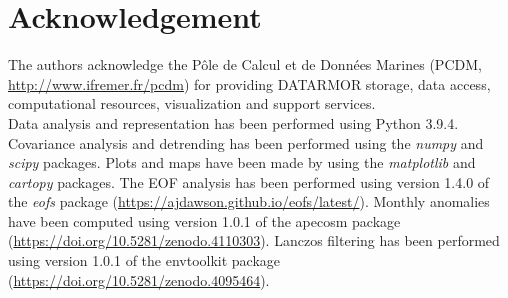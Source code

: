 \documentclass[review, 12pt]{elsarticle}
\begin{document}
\section*{Acknowledgement}

The authors acknowledge the Pôle de Calcul et de Données Marines (PCDM, \url{http://www.ifremer.fr/pcdm}) for providing DATARMOR storage, data access, computational resources, visualization and support services.\\

Data analysis and representation has been performed using Python 3.9.4. 
Covariance analysis and detrending has been performed using the \emph{numpy} and \emph{scipy} packages. Plots and maps have been made by using the \emph{matplotlib} and \emph{cartopy} packages.
The EOF analysis has been performed using version 1.4.0 of the \emph{eofs} package (\url{https://ajdawson.github.io/eofs/latest/}). 
Monthly anomalies have been computed using version 1.0.1 of the apecosm package (\url{https://doi.org/10.5281/zenodo.4110303}).
Lanczos filtering has been performed using version 1.0.1 of the envtoolkit package (\url{https://doi.org/10.5281/zenodo.4095464}).

\listoffigures
\listoftables

\clearpage


\end{document}
